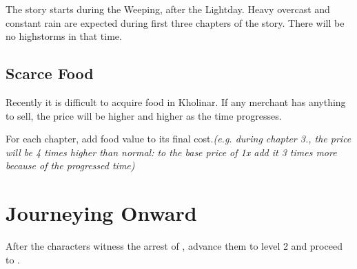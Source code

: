The story starts during the Weeping, after the Lightday. Heavy overcast and constant rain are expected during first three chapters of the story. There will be no highstorms in that time.

\subsection{Scarce Food}

Recently it is difficult to acquire food in Kholinar. If any merchant has anything to sell, the price will be higher and higher as the time progresses.

For each chapter, add food value to its final cost.\textit{(e.g. during chapter 3., the price will be 4 times higher than normal: to the base price of 1x add it 3 times more because of the progressed time)}




\newpage



\section{Journeying Onward}

After the characters witness the arrest of \npcRebelArdent{}, advance them to level 2 and proceed to .